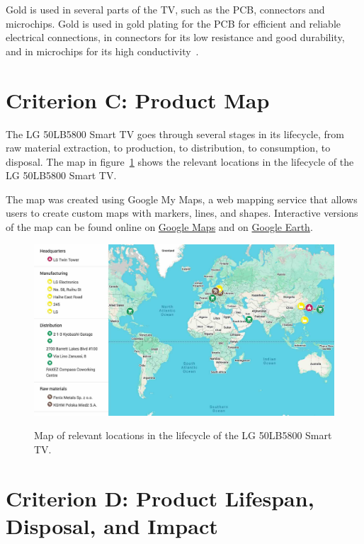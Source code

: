 \documentclass[12pt, letterpaper]{article}
\begin{document}
Gold is used in several parts of the TV, such as the PCB, connectors
and microchips. Gold is used in gold plating for the PCB for
efficient and reliable electrical connections, in connectors for its
low resistance and good durability, and in microchips for its high
conductivity~\autocite{elmore-2024}.

\section{Criterion C: Product Map}

The LG 50LB5800 Smart TV goes through several stages in its lifecycle,
from raw material extraction, to production, to distribution, to
consumption, to disposal. The map in figure~\ref{fig:lg-map} shows the
relevant locations in the lifecycle of the LG 50LB5800 Smart TV.\@

The map was created using Google My Maps, a web mapping service that
allows users to create custom maps with markers, lines, and shapes.
Interactive versions of the map can be found online on
\href{https://www.google.com/maps/d/edit?mid=1_aeai9S8RSvkTi9m7rJfM217r6kOGgc&usp=sharing}{Google
Maps} and on
\href{https://www.google.com/maps/d/earth?mid=1_aeai9S8RSvkTi9m7rJfM217r6kOGgc}{Google
Earth}.

\begin{figure}[H]
\medskip
\centering
\includegraphics[width=1\linewidth]{lg-map}
\caption{Map of relevant locations in the lifecycle of the LG
50LB5800 Smart TV.}
\medskip\label{fig:lg-map}
\end{figure}

\section{Criterion D: Product Lifespan, Disposal, and Impact}

\printbibliography[heading=bibintoc,title=References]
\end{document}
